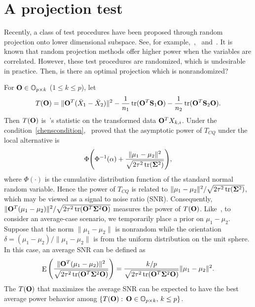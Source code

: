 \documentclass[3p]{elsarticle}
\DeclareMathOperator{\mytr}{tr}
\DeclareMathOperator{\myE}{E}
\theoremstyle{plain}
\theoremstyle{definition}
\theoremstyle{remark}
\begin{document}
\section{A projection test}\label{methodology}


Recently, a class of test procedures have been proposed through random projection onto lower dimensional subspace. See, for example,~\cite{Lopes2015A},~\cite{Thulin2014A} and~\cite{Srivastava2014RAPTT}.
It is known that random projection methods offer higher power when the variables are correlated.
However, these test procedures are randomized, which is undesirable in practice.
Then, is there an optimal projection which is nonrandomized?

For $\mathbf{O}\in \mathbb{O}_{p\times k}$ ($1\leq k\leq p$), let
$$
    T(\BO)=\|\BO^T(\bar{X}_1-\bar{X}_2)\|^2-\frac{1}{n_1}\mytr(\BO^T \BS_1\BO)-\frac{1}{n_2}\mytr(\BO^T \BS_2\BO).
$$
Then $T(\mathbf{O})$ is~\cite{Chen2010A}'s statistic on the transformed data $\mathbf{O}^T X_{k,i}$.
Under the condition~\eqref{chenscondition},~\cite{Chen2010A} proved that the asymptotic power of $T_{CQ}$ under the local alternative is
$$
\Phi\Bigg(\Phi^{-1}(\alpha)+\frac{\|\mu_1-\mu_2\|^2}{\sqrt{2\tau^2\mytr(\bSigma^2)}}\Bigg),
$$
where $\Phi(\cdot)$ is the cumulative distribution function of the standard normal random variable.
Hence the power of $T_{CQ}$ is related to $\|\mu_1-\mu_2\|^2/\sqrt{2\tau^2\mytr(\bSigma^2)}$, which may be viewed as a signal to noise ratio (SNR).
Consequently, $\|\BO^T (\mu_1-\mu_2)\|^2/\sqrt{2\tau^2\mytr(\BO^T \bSigma^2 \BO)}$ measures the power of $T(\mathbf{O})$.
 Like~\cite{Lopes2015A}, to consider an average-case scenario, we temporarily place a prior on $\mu_1-\mu_2$.
Suppose that the norm $\|\mu_1-\mu_2\|$ is nonrandom while the orientation $\delta=(\mu_1-\mu_2)/\|\mu_1-\mu_2\|$ is from the uniform distribution on the unit sphere.
In this case, an average SNR can be defined as
\begin{equation}\label{touteng}
\myE \Bigg( \frac{\|\BO^T (\mu_1-\mu_2)\|^2}{\sqrt{2\tau^2\mytr(\BO^T \bSigma^2 \BO)}}\Bigg)
=  \frac{k/p}{\sqrt{2\tau^2\mytr(\BO^T \bSigma^2 \BO)}}\|\mu_1-\mu_2\|^2.
\end{equation}
The $T(\mathbf{O})$ that maximizes the average SNR can be expected to have the best average power behavior among $\{T(\mathbf{O}):\, \mathbf{O}\in \mathbb{O}_{p\times k},\,  k\leq p\}$.
\end{document}
